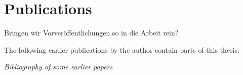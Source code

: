 



\chapter{Publications}
Bringen wir Vorveröffentlichungen so in die Arbeit rein?

The following earlier publications by the author contain parts of this thesis.

\textit{Bibliography of some earlier papers}




